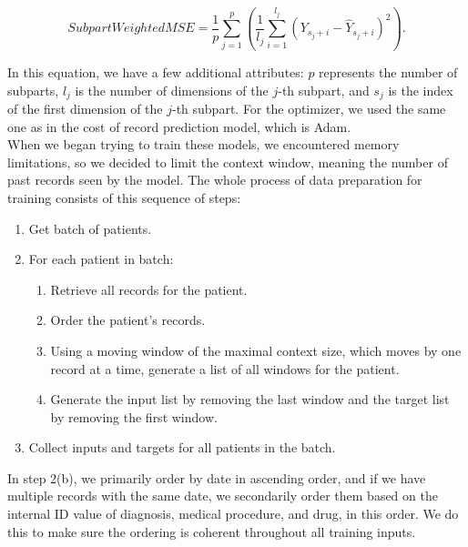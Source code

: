 \begin{equation}
	\label{eqn:swmse}
	SubpartWeightedMSE = \frac{1}{p} \sum_{j=1}^{p}(\frac{1}{l_j}\sum_{i=1}^{l_j}(Y_{s_j+i}-\hat{Y}_{s_j+i})^2).
\end{equation} 

In this equation, we have a few additional attributes: $p$ represents the number of subparts, $l_j$ is the number of dimensions of the $j$-th subpart, and $s_j$ is the index of the first dimension of the $j$-th subpart. For the optimizer, we used the same one as in the cost of record prediction model, which is Adam.
\\

When we began trying to train these models, we encountered memory limitations, so we decided to limit the context window, meaning the number of past records seen by the model. The whole process of data preparation for training consists of this sequence of steps:

\begin{enumerate}
	\item Get batch of patients.
	\item For each patient in batch:
	\begin{enumerate}
		\item Retrieve all records for the patient.
		\item Order the patient's records.
		\item Using a moving window of the maximal context size, which moves by one record at a time, generate a list of all windows for the patient.
		\item Generate the input list by removing the last window and the target list by removing the first window.
	\end{enumerate}
	\item Collect inputs and targets for all patients in the batch.
\end{enumerate}

In step 2(b), we primarily order by date in ascending order, and if we have multiple records with the same date, we secondarily order them based on the internal ID value of diagnosis, medical procedure, and drug, in this order. We do this to make sure the ordering is coherent throughout all training inputs.
\\ 

